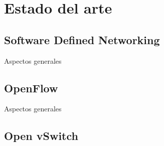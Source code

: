 \chapter{Estado del arte}

\graphicspath{{Chapter2/Figs/}}

\section{Software Defined Networking}
Aspectos generales



\section{OpenFlow}
Aspectos generales


\section{Open vSwitch}









